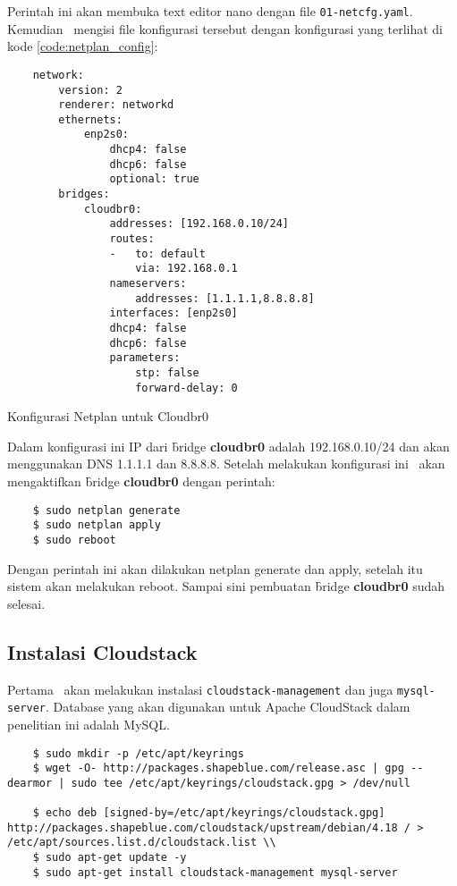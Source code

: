 Perintah ini akan membuka text editor nano dengan file \texttt{01-netcfg.yaml}. Kemudian \saya\ mengisi file konfigurasi tersebut dengan konfigurasi yang terlihat di kode \ref{code:netplan_config}:

\begin{listing}[H]
    \begin{verbatim}
    network:
        version: 2
        renderer: networkd
        ethernets:
            enp2s0:
                dhcp4: false
                dhcp6: false
                optional: true
        bridges:
            cloudbr0:
                addresses: [192.168.0.10/24]
                routes:
                -   to: default
                    via: 192.168.0.1
                nameservers:
                    addresses: [1.1.1.1,8.8.8.8]
                interfaces: [enp2s0]
                dhcp4: false
                dhcp6: false
                parameters:
                    stp: false
                    forward-delay: 0
    \end{verbatim}
    \caption{Konfigurasi Netplan untuk Cloudbr0}
    \label{code:netplan_config}
\end{listing}

Dalam konfigurasi ini IP dari \f{bridge} \textbf{cloudbr0} adalah 192.168.0.10/24 dan akan menggunakan DNS 1.1.1.1 dan 8.8.8.8. Setelah melakukan konfigurasi ini \saya\ akan mengaktifkan \f{bridge} \textbf{cloudbr0} dengan perintah:

\begin{listing}[H]
    \begin{verbatim}     
    $ sudo netplan generate
    $ sudo netplan apply
    $ sudo reboot
    \end{verbatim}
\end{listing}

Dengan perintah ini akan dilakukan netplan generate dan apply, setelah itu sistem akan melakukan reboot. Sampai sini pembuatan \f{bridge} \textbf{cloudbr0} sudah selesai.

\subsection{Instalasi Cloudstack}
Pertama \saya\ akan melakukan instalasi \texttt{cloudstack-management} dan juga \texttt{mysql-server}. Database yang akan digunakan untuk Apache CloudStack dalam penelitian ini adalah MySQL.

\begin{listing}[H]
    \begin{verbatim}    
    $ sudo mkdir -p /etc/apt/keyrings
    $ wget -O- http://packages.shapeblue.com/release.asc | gpg --dearmor | sudo tee /etc/apt/keyrings/cloudstack.gpg > /dev/null
    
    $ echo deb [signed-by=/etc/apt/keyrings/cloudstack.gpg] http://packages.shapeblue.com/cloudstack/upstream/debian/4.18 / > /etc/apt/sources.list.d/cloudstack.list \\
    $ sudo apt-get update -y
    $ sudo apt-get install cloudstack-management mysql-server
    \end{verbatim}
\end{listing}

